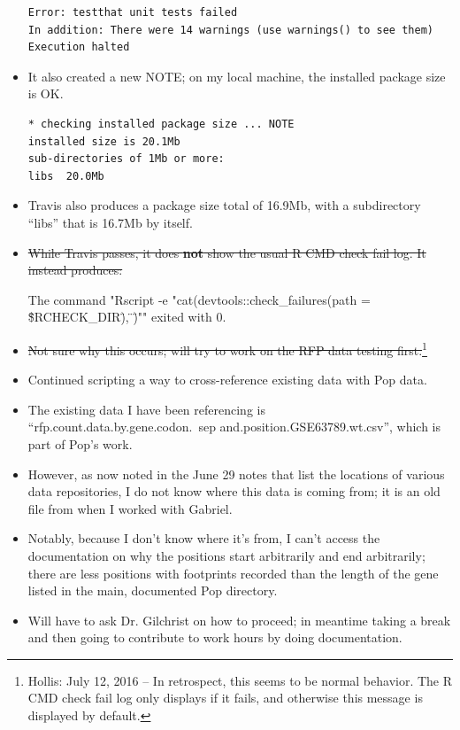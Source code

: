 \documentclass[12pt,hyperref]{labbook}
\newcommand{\sep}{\discretionary{}{}{}} %
\begin{document}
\begin{itemize}
\begin{minipage}{\linewidth}
\begin{lstlisting}
Error: testthat unit tests failed
In addition: There were 14 warnings (use warnings() to see them)
Execution halted
\end{lstlisting}
\end{minipage}
    
    \item It also created a new NOTE; on my local machine, the installed package size is OK.
    
\noindent\begin{minipage}{\linewidth}
\begin{lstlisting}
* checking installed package size ... NOTE
installed size is 20.1Mb
sub-directories of 1Mb or more:
libs  20.0Mb
\end{lstlisting}
\end{minipage}
    
    \item Travis also produces a package size total of 16.9Mb, with a subdirectory \enquote{libs} that is 16.7Mb by itself.
    \item \sout{While Travis passes, it does \textbf{not} show the usual R CMD check fail log. It instead produces:}

\begin{verbquote}
The command "Rscript -e "cat(devtools::check_failures(path = \"\${RCHECK_DIR}\"), \"\n\")"" exited with 0.
\end{verbquote}
    
    \item \sout{Not sure why this occurs; will try to work on the RFP data testing first.}\footnote{Hollis: July 12, 2016 -- In retrospect, this seems to be normal behavior. The R CMD check fail log only displays if it fails, and otherwise this message is displayed by default.\label{fn:TravisError}}
    \item Continued scripting a way to cross-reference existing data with Pop data.
    \item The existing data I have been referencing is \enquote{rfp\sep .\sep count\sep .\sep data\sep .\sep by\sep .\sep gene\sep .\sep codon\sep .\     sep and\sep .\sep position\sep .\sep GSE63789\sep .\sep wt\sep .\sep csv}, which is part of Pop's work.
    \item However, as now noted in the June 29 notes that list the locations of various data repositories, I do not know where this data is coming from; it is an old file from when I worked with Gabriel.
    \item Notably, because I don't know where it's from, I can't access the documentation on why the positions start arbitrarily and end arbitrarily; there are less positions with footprints recorded than the length of the gene listed in the main, documented Pop directory.
    \item Will have to ask Dr. Gilchrist on how to proceed; in meantime taking a break and then going to contribute to work hours by doing documentation.
\end{itemize}
\end{document}
